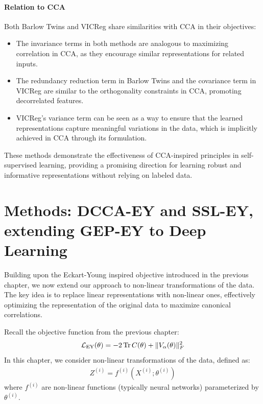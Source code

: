 \paragraph{Relation to CCA}
Both Barlow Twins and VICReg share similarities with CCA in their objectives:

\begin{itemize}
    \item The invariance terms in both methods are analogous to maximizing correlation in CCA, as they encourage similar representations for related inputs.
    \item The redundancy reduction term in Barlow Twins and the covariance term in VICReg are similar to the orthogonality constraints in CCA, promoting decorrelated features.
    \item VICReg's variance term can be seen as a way to ensure that the learned representations capture meaningful variations in the data, which is implicitly achieved in CCA through its formulation.
\end{itemize}

These methods demonstrate the effectiveness of CCA-inspired principles in self-supervised learning, providing a promising direction for learning robust and informative representations without relying on labeled data.

\section{Methods: DCCA-EY and SSL-EY, extending GEP-EY to Deep Learning}

Building upon the Eckart-Young inspired objective introduced in the previous chapter, we now extend our approach to non-linear transformations of the data. The key idea is to replace linear representations with non-linear ones, effectively optimizing the representation of the original data to maximize canonical correlations.

Recall the objective function from the previous chapter:
\begin{align}
\mathcal{L}_\text{EY}(\theta) = -2 \operatorname{Tr} C(\theta) + \lVert V_\alpha(\theta)\rVert_F^2
\end{align}
In this chapter, we consider non-linear transformations of the data, defined as:
\begin{align}
Z^{(i)} = f^{(i)}(X^{(i)}; \theta^{(i)})
\end{align}
where $f^{(i)}$ are non-linear functions (typically neural networks) parameterized by $\theta^{(i)}$.


